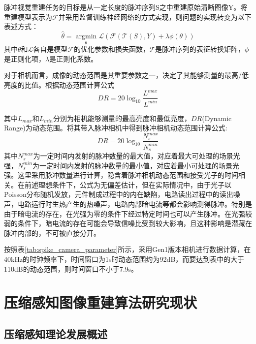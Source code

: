 脉冲视觉重建任务的目标是从一定长度的脉冲序列S之中重建原始清晰图像Y。将重建模型表示为$\mathcal{F}$并采用监督训练神经网络的方式实现，则问题的实现转变为以下表述方式：
\begin{equation}
  \label{eq:3}
  \hat{\theta} = \mathop{\arg\min}\limits_{\theta} \mathcal{L}(\mathcal{F}(\mathcal{T}(S),Y) + \lambda \phi(\theta))
\end{equation}
其中$\theta$和$\mathcal{L}$各自是模型$\mathcal{F}$的优化参数和损失函数，$\mathcal{T}$是脉冲序列的表征转换矩阵，$\phi$是正则化项，$\lambda$是正则化系数。

对于相机而言，成像的动态范围是其重要参数之一，决定了其能够测量的最高/低亮度的比值。根据动态范围计算公式
\begin{equation}
  \label{eq:7}
  DR = 20 \log_{10} \frac{L^{max}}{L^{min}}
\end{equation}

其中$L_{max}$和$L_{min}$分别为相机能够测量的最高亮度和最低亮度，$DR$(Dynamic Range)为动态范围。将其带入脉冲相机中得到脉冲相机动态范围计算公式:
\begin{equation}
  \label{eq:8}
  DR = 20 \log_{10} \frac{N^{max}_s}{N^{min}_s}
\end{equation}
其中$N^{max}_s$为一定时间内发射的脉冲数量的最大值，对应着最大可处理的场景光强，$N^{min}_s$为一定时间内发射的脉冲数量的最小值，对应着最小可处理的场景光强。这里采用脉冲数量进行计算，隐含着脉冲相机动态范围和接受光子的时间相关。在前述理想条件下，公式为无偏差估计，但在实际情况中，由于光子以Poisson分布随机发放，元件制成过程中的内在缺陷，电路读出过程中的读出噪声，电路运行时生热产生的热噪声，电路内部暗电流等都会影响测得脉冲。特别是由于暗电流的存在，在光强为零的条件下经过特定时间也可以产生脉冲。在光强较弱的条件下，暗电流的存在可能会导致信噪比受到较大影响，且这种影响是潜藏在脉冲内部的，不可被直接分开。

按照表\ref{tab:spike_camera_parameter}所示，采用Gen1版本相机进行数据计算，在40kHz的时钟频率下，时间窗口为1s时动态范围约为92dB，而要达到表中的大于110dB的动态范围，则时间窗口不小于7.9s。


\section{压缩感知图像重建算法研究现状}
\subsection{压缩感知理论发展概述}

